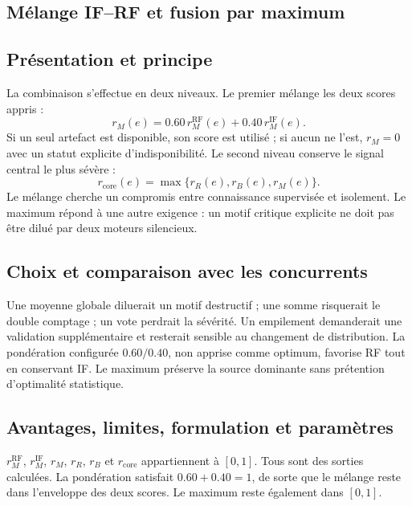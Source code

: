 \documentclass[11pt,a4paper,oneside]{report}
\theoremstyle{definition}
\theoremstyle{plain}
\begin{document}
\subsection{Mélange IF--RF et fusion par maximum}
\label{sec:ai-ro-fusion}

\subsection*{Présentation et principe}

La combinaison s'effectue en deux niveaux. Le premier mélange les deux scores appris :
\begin{equation}
r_M(e)=0.60\,r_M^{\mathrm{RF}}(e)+0.40\,r_M^{\mathrm{IF}}(e).
\label{eq:ai-ro-ml-blend}
\end{equation}
Si un seul artefact est disponible, son score est utilisé ; si aucun ne l'est, $r_M=0$ avec un statut explicite d'indisponibilité. Le second niveau conserve le signal central le plus sévère :
\begin{equation}
r_{\mathrm{core}}(e)=\max\{r_R(e),r_B(e),r_M(e)\}.
\label{eq:ai-ro-core-fusion}
\end{equation}
Le mélange cherche un compromis entre connaissance supervisée et isolement. Le maximum répond à une autre exigence : un motif critique explicite ne doit pas être dilué par deux moteurs silencieux.

\subsection*{Choix et comparaison avec les concurrents}

Une moyenne globale diluerait un motif destructif ; une somme risquerait le double comptage ; un vote perdrait la sévérité. Un empilement demanderait une validation supplémentaire et resterait sensible au changement de distribution. La pondération configurée $0.60/0.40$, non apprise comme optimum, favorise RF tout en conservant IF. Le maximum préserve la source dominante sans prétention d'optimalité statistique.

\subsection*{Avantages, limites, formulation et paramètres}

$r_M^{\mathrm{RF}}$, $r_M^{\mathrm{IF}}$, $r_M$, $r_R$, $r_B$ et
$r_{\mathrm{core}}$ appartiennent à $[0,1]$. Tous sont des sorties calculées. La
pondération satisfait $0.60+0.40=1$, de sorte que le mélange reste dans l'enveloppe
des deux scores. Le maximum reste également dans $[0,1]$.
\end{document}
